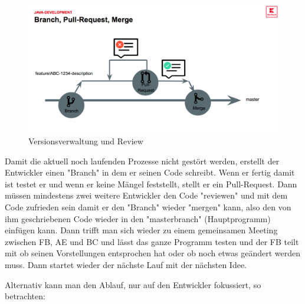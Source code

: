     \begin{figure}[H]
        \centering
        \includegraphics[width=\textwidth]{include/images/Branch.png}
        \caption{Versionsverwaltung und Review}
        \label{fig-Versionsverwaltung}
    \end{figure}

    Damit die aktuell noch laufenden Prozesse nicht gestört werden, erstellt der Entwickler einen "Branch" in dem er seinen Code schreibt. Wenn er fertig damit ist testet er und wenn er keine Mängel feststellt, stellt er ein Pull-Request. Dann müssen mindestens zwei weitere Entwickler den Code "reviewen" und mit dem Code zufrieden sein damit er den "Branch" wieder "mergen" kann, also den von ihm geschriebenen Code wieder in den "masterbranch" (Hauptprogramm) einfügen kann. Dann trifft man sich wieder zu einem gemeinsamen Meeting zwischen FB, AE und BC und lässt das ganze Programm testen und der FB teilt mit ob seinen Vorstellungen entsprochen hat oder ob noch etwas geändert werden muss. Dann startet wieder der nächste Lauf mit der nächsten Idee.

    Alternativ kann man den Ablauf, nur auf den Entwickler fokussiert, so betrachten:


